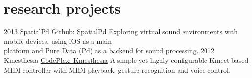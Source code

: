 \documentclass[]{friggeri-cv}
\begin{document}
\section{research projects}
\begin{entrylist}
  \entry
    {2013}
    {SpatialPd}
    {\href{https://github.com/Apolotary/SpatialPd}{Github: SpatialPd}}
    {Exploring virtual sound environments with mobile devices, using iOS as a main\\
    platform and Pure Data (Pd) as a backend for sound processing.}
  \entry
    {2012}
    {Kinesthesia}
    {\href{https://kinesthesia.codeplex.com/}{CodePlex: Kinesthesia}}
    {A simple yet highly configurable Kinect-based MIDI controller with MIDI playback, gesture recognition and voice control.}
\end{entrylist}
%
%
\end{document}
